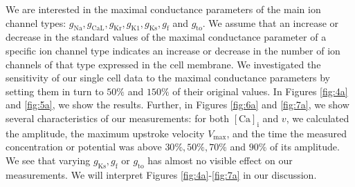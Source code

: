 \documentclass{article}
\begin{document}
We are interested in the maximal conductance parameters of the main ion channel types: $g_{\mathrm{Na}}, g_{\mathrm{CaL}}, g_{\mathrm{Kr}}, g_{\mathrm{K1}}, g_{\mathrm{Ks}}, g_{\mathrm{f}}$ and $g_{\mathrm{to}}$. We assume that an increase or decrease in the standard values of the maximal conductance parameter of a specific ion channel type indicates an increase or decrease in the number of ion channels of that type expressed in the cell membrane. We investigated the sensitivity of our single cell data to the maximal conductance parameters by setting them in turn to $50\%$ and $150\%$ of their original values. In Figures \ref{fig:4a} and \ref{fig:5a}, we show the results. Further, in Figures \ref{fig:6a} and \ref{fig:7a}, we show several characteristics of our measurements: for both $[\mathrm{Ca}]_{\mathrm{i}}$ and $v$, we calculated the amplitude, the maximum upstroke velocity $V_{\mathrm{max}}$, and the time the measured concentration or potential was above $30\%, 50\%, 70\%$ and $90\%$ of its amplitude. We see that varying $g_{\mathrm{Ks}}, g_{\mathrm{f}}$ or $g_{\mathrm{to}}$ has almost no visible effect on our measurements. We will interpret Figures \ref{fig:4a}-\ref{fig:7a} in our discussion.
\end{document}
